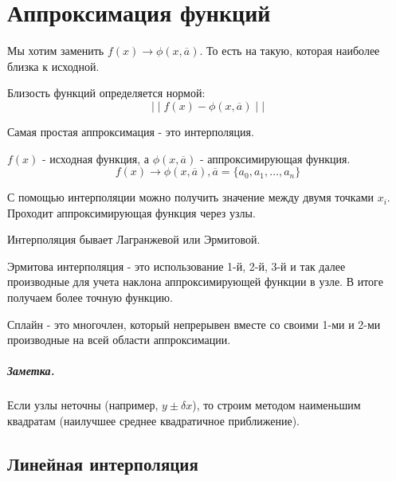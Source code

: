 

\title{}
\author{Козырнов Александр Дмитриевич, ИУ7-42Б}
\date{\today}


\chapter{Аппроксимация функций}

Мы хотим заменить $f(x) \to \phi(x, \overline{a})$. То есть на такую, которая наиболее
близка к исходной.

\begin{definition}
Близость функций определяется нормой: \[
      \mid\mid f(x) - \phi(x, \overline{a}) \mid  \mid 
\] 
\end{definition}

\medskip

Самая простая аппроксимация - это интерполяция.

\begin{definition}
$f(x)$ - исходная функция, а  $\phi(x,\overline{a})$ - аппроксимирующая функция.
\[
f(x) \to \phi(x,\overline{a}), \overline{a} = \{a_0,a_1,\ldots,a_{n}\} 
\] 
\end{definition}

С помощью интерполяции можно получить значение между двумя точками $x_{i}$.
Проходит аппроксимирующая функция через узлы.

Интерполяция бывает Лагранжевой или Эрмитовой.

\begin{definition}
Эрмитова интерполяция - это использование 1-й, 2-й, 3-й и так далее производные для
учета наклона аппроксимирующей функции в узле. В итоге получаем более точную функцию.
\end{definition}

\begin{definition}
Сплайн - это многочлен, который непрерывен вместе со своими 1-ми и 2-ми производные на
всей области аппроксимации.
\end{definition}

\paragraph*{Заметка.}
Если узлы неточны (например, $y \pm \delta x$), то строим методом наименьшим квадратам
(наилучшее среднее квадратичное приближение).

\section{Линейная интерполяция}

